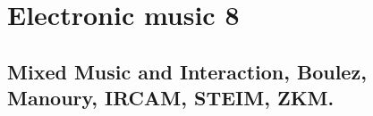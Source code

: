 
\chapter{Electronic music 8}
\label{history8}

\section{Mixed Music and Interaction, Boulez, Manoury, IRCAM, STEIM, ZKM.}




